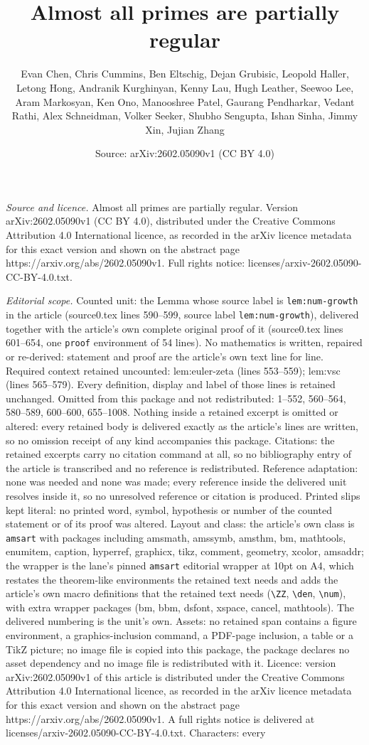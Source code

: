 \documentclass[10pt,a4paper]{amsart}
\title[Almost all primes are partially regular]{Almost all primes are partially regular}
\author{Evan Chen, Chris Cummins, Ben Eltschig, Dejan Grubisic, Leopold Haller, Letong Hong, Andranik Kurghinyan, Kenny Lau, Hugh Leather, Seewoo Lee, Aram Markosyan, Ken Ono, Manooshree Patel, Gaurang Pendharkar, Vedant Rathi, Alex Schneidman, Volker Seeker, Shubho Sengupta, Ishan Sinha, Jimmy Xin, Jujian Zhang}
\date{Source: arXiv:2602.05090v1 (CC BY 4.0)}
\begin{document}
\maketitle

\noindent\emph{Source and licence.} Almost all primes are partially regular. Version arXiv:2602.05090v1 (CC BY 4.0), distributed under the Creative Commons Attribution 4.0 International licence, as recorded in the arXiv licence metadata for this exact version and shown on the abstract page https://arxiv.org/abs/2602.05090v1. Full rights notice: licenses/arxiv-2602.05090-CC-BY-4.0.txt.\par\smallskip

\noindent\textit{Editorial scope.} Counted unit: the Lemma whose source label is \texttt{lem:num-growth} in the article (source0.tex lines 590--599, source label \texttt{lem:num-growth}), delivered together with the article's own complete original proof of it (source0.tex lines 601--654, one \texttt{proof} environment of 54 lines). No mathematics is written, repaired or re-derived: statement and proof are the article's own text line for line. Required context retained uncounted: lem:euler-zeta (lines 553--559); lem:vsc (lines 565--579). Every definition, display and label of those lines is retained unchanged. Omitted from this package and not redistributed: 1--552, 560--564, 580--589, 600--600, 655--1008. Nothing inside a retained excerpt is omitted or altered: every retained body is delivered exactly as the article's lines are written, so no omission receipt of any kind accompanies this package. Citations: the retained excerpts carry no citation command at all, so no bibliography entry of the article is transcribed and no reference is redistributed. Reference adaptation: none was needed and none was made; every reference inside the delivered unit resolves inside it, so no unresolved reference or citation is produced. Printed slips kept literal: no printed word, symbol, hypothesis or number of the counted statement or of its proof was altered. Layout and class: the article's own class is \texttt{amsart} with packages including amsmath, amssymb, amsthm, bm, mathtools, enumitem, caption, hyperref, graphicx, tikz, comment, geometry, xcolor, amsaddr; the wrapper is the lane's pinned \texttt{amsart} editorial wrapper at 10pt on A4, which restates the theorem-like environments the retained text needs and adds the article's own macro definitions that the retained text needs (\texttt{\textbackslash ZZ}, \texttt{\textbackslash den}, \texttt{\textbackslash num}), with extra wrapper packages (bm, bbm, dsfont, xspace, cancel, mathtools). The delivered numbering is the unit's own. Assets: no retained span contains a figure environment, a graphics-inclusion command, a PDF-page inclusion, a table or a TikZ picture; no image file is copied into this package, the package declares no asset dependency and no image file is redistributed with it. Licence: version arXiv:2602.05090v1 of this article is distributed under the Creative Commons Attribution 4.0 International licence, as recorded in the arXiv licence metadata for this exact version and shown on the abstract page https://arxiv.org/abs/2602.05090v1. A full rights notice is delivered at licenses/arxiv-2602.05090-CC-BY-4.0.txt. Characters: every 
\end{document}
